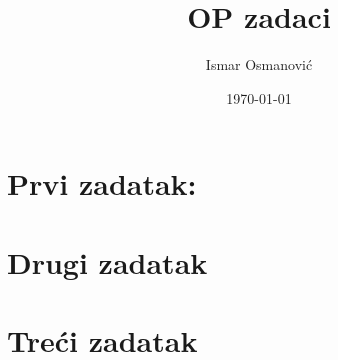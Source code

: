 \documentclass[a4paper, 12pt]{article}
\title{\huge OP zadaci}
\author{Ismar Osmanović}
\date{\today}
\begin{document}
\maketitle

\section {Prvi zadatak:}


\pagebreak

\section {Drugi zadatak}



\section {Treći zadatak}


\end{document}
